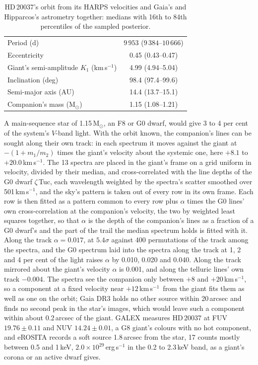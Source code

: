 \documentclass[3p,11pt]{elsarticle}
\newcommand{\kms}{km\,s$^{-1}$}
\newcommand{\Msun}{M$_\odot$}
\begin{document}
\begin{table}[t]
\centering
\caption{HD\,20037's orbit from its HARPS velocities and Gaia's and Hipparcos's astrometry
together: medians with 16th to 84th percentiles of the sampled posterior.}\label{tab:hd20037}
\small
\begin{tabular}{lc}
\toprule
Period (d) & $9\,953$ ($9\,384$--$10\,666$)\\
Eccentricity & 0.45 (0.43--0.47)\\
Giant's semi-amplitude $K_1$ (\kms) & 4.99 (4.94--5.04)\\
Inclination (deg) & 98.4 (97.4--99.6)\\
Semi-major axis (AU) & 14.4 (13.7--15.1)\\
Companion's mass (\Msun) & 1.15 (1.08--1.21)\\
\bottomrule
\end{tabular}
\end{table}

A main-sequence star of 1.15\,\Msun, an F8 or G0 dwarf, would give 3 to 4 per cent of the
system's $V$-band light. With the orbit known, the companion's lines can be sought along their own
track: in each spectrum it moves against the giant at $-(1 + m_1/m_2)$ times the giant's velocity
about the systemic one, here $+8.1$ to $+20.0$\,\kms. The 13 spectra are placed in the giant's
frame on a grid uniform in velocity, divided by their median, and cross-correlated with the line
depths of the G0 dwarf $\zeta$\,Tuc, each wavelength weighted by the spectra's scatter smoothed
over 501\,\kms, and the sky's pattern is taken out of every row in its own frame. Each row is then
fitted as a pattern common to every row plus $\alpha$ times the G0 lines' own cross-correlation at
the companion's velocity, the two by weighted least squares together, so that $\alpha$ is the depth
of the companion's lines as a fraction of a G0 dwarf's and the part of the trail the median
spectrum holds is fitted with it. Along the track $\alpha = 0.017$, at $5.4\sigma$ against 400
permutations of the track among the spectra, and the G0 spectrum laid into the spectra along the
track at 1, 2 and 4 per cent of the light raises $\alpha$ by 0.010, 0.020 and 0.040. Along the
track mirrored about the giant's velocity $\alpha$ is 0.001, and along the telluric lines' own track
$-0.004$. The spectra see the companion only between $+8$ and $+20$\,\kms, so a component at a fixed
velocity near $+12$\,\kms\ from the giant fits them as well as one on the orbit; Gaia DR3 holds no
other source within 20\,arcsec and finds no second peak in the star's images, which would leave
such a component within about 0.2\,arcsec of the giant. GALEX measures HD\,20037 at FUV
$19.76 \pm 0.11$ and NUV $14.24 \pm 0.01$, a G8 giant's colours with no hot component, and eROSITA
records a soft source 1.8\,arcsec from the star, 17 counts mostly between 0.5 and 1\,keV,
$2.0\times10^{29}$\,erg\,s$^{-1}$ in the 0.2 to 2.3\,keV band, as a giant's corona or an active
dwarf gives.
\end{document}
